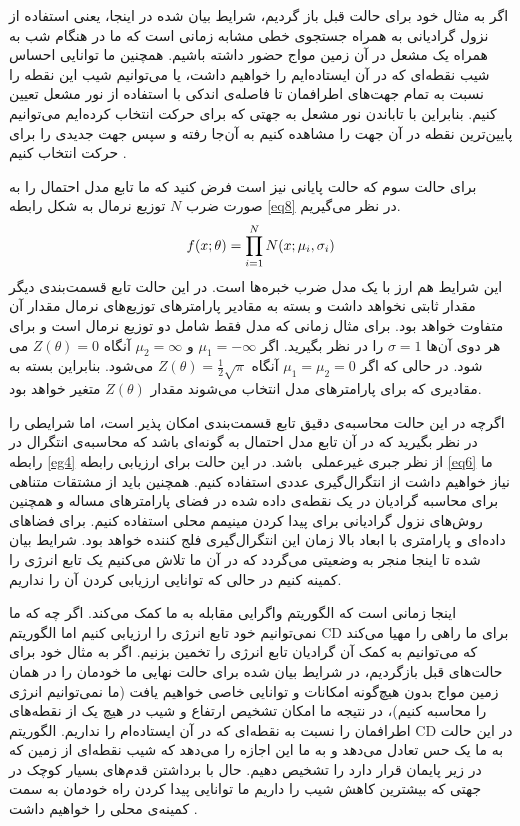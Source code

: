 اگر به مثال خود برای حالت قبل باز گردیم، شرایط بیان شده در اینجا، یعنی‌ استفاده از نزول گرادیانی به همراه جستجوی خطی‌ مشابه زمانی‌ است که ما در هنگام شب به همراه یک مشعل در آن زمین مواج حضور داشته باشیم. همچنین ما توانایی احساس شیب نقطه‌ای که در آن ایستاده‌ایم را خواهیم داشت، یا می‌‌توانیم شیب این نقطه را نسبت به تمام جهت‌های اطرافمان تا فاصله‌ی اندکی‌ با استفاده از نور مشعل تعیین کنیم. بنابراین با تاباندن نور مشعل به جهتی‌ که برای حرکت انتخاب کرده‌ایم می‌‌توانیم پایین‌ترین نقطه در آن جهت را مشاهده کنیم به آن‌جا رفته و سپس جهت جدیدی را برای حرکت انتخاب کنیم
 \cite{woodfordnotes}.

 
 
 برای حالت سوم که حالت پایانی نیز است فرض کنید که ما تابع مدل احتمال را به صورت ضرب
 $N$
 توزیع نرمال به شکل رابطه
\ref{eq8}
 در نظر می‌‌گیریم.
 \begin{align}
 \centering
 	f(x;\theta)=\prod_{i=1}^N N(x;\mu_i,\sigma_i)
 \label{eq8}
 \end{align}
این شرایط هم ارز با یک مدل ضرب خبره‌ها است. در این حالت تابع قسمت‌بندی دیگر مقدار ثابتی نخواهد داشت و بسته به مقادیر پارامتر‌های توزیع‌های نرمال مقدار آن متفاوت خواهد بود. برای مثال زمانی‌ که مدل فقط شامل دو توزیع نرمال است و برای هر دوی آن‌ها
 $\sigma = 1$
 را در نظر بگیرید. اگر
 $\mu_1 = -\infty$
 و
 $\mu_2 = \infty$
 آنگاه
 $Z(\theta) = 0$
 می‌ شود. در حالی‌ که اگر
 $\mu_1 = \mu_2 = 0$
 آنگاه
 $Z(\theta) = \frac{1}{2}\sqrt{\pi}$
 می‌شود. بنابراین بسته به مقادیری که برای پارامتر‌های مدل انتخاب می‌‌شوند مقدار
 $Z(\theta)$
 متغیر خواهد بود.
 
 اگرچه در این حالت محاسبه‌‌ی دقیق تابع قسمت‌بندی امکان پذیر است، اما شرایطی را در نظر بگیرید که در آن تابع مدل احتمال به گونه‌ای باشد که محاسبه‌ی‌ انتگرال در رابطه
\ref{eg4}
 از نظر جبری غیرعملی
 ‌ باشد. در این حالت برای ارزیابی رابطه
\ref{eq6}
 ما نیاز خواهیم داشت از انتگرال‌گیری عددی
 استفاده کنیم. همچنین باید از مشتقات متناهی برای محاسبه گرادیان در یک نقطه‌ی داده شده در فضای پارامتر‌های مساله و همچنین روش‌های نزول گرادیانی برای پیدا کردن مینیمم محلی استفاده کنیم. برای فضاهای داده‌ای و پارامتری با ابعاد بالا زمان این انتگرال‌گیری فلج کننده
 خواهد بود. شرایط بیان شده تا اینجا منجر به وضعیتی می‌‌گردد که در آن ما تلاش می‌‌کنیم یک تابع انرژی را کمینه کنیم در حالی‌ که توانایی ارزیابی کردن آن را نداریم.
 
 اینجا زمانی‌ است که الگوریتم واگرایی مقابله به ما کمک می‌‌کند. اگر چه که ما نمی‌‌توانیم خود تابع انرژی را ارزیابی کنیم اما الگوریتم
 CD
 برای ما راهی‌ را مهیا می‌‌کند که می‌توانیم به کمک آن گرادیان تابع انرژی را تخمین بزنیم. اگر به مثال خود برای حالت‌های قبل بازگردیم، در شرایط بیان شده برای حالت نهایی ما خودمان را در همان زمین مواج بدون هیچ‌گونه امکانات و توانایی خاصی خواهیم یافت (ما نمی‌‌توانیم انرژی را محاسبه کنیم)، در نتیجه ما امکان تشخیص ارتفاع و شیب در هیچ یک از نقطه‌های اطرافمان را نسبت به نقطه‌ای که در آن ایستاده‌ام را نداریم. الگوریتم
 CD
 در این حالت به ما یک حس تعادل می‌‌دهد و به ما این اجازه را می‌‌دهد که شیب نقطه‌ای از زمین که در زیر پایمان قرار دارد را تشخیص دهیم. حال با برداشتن قدم‌های بسیار کوچک در جهتی‌ که بیشترین کاهش شیب را داریم ما توانایی پیدا کردن راه خودمان به سمت کمینه‌ی محلی را خواهیم داشت
 \cite{woodfordnotes}.
 
